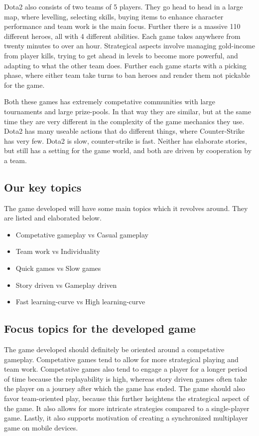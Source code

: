 Dota2 also consists of two teams of 5 players. They go head to head in a large map, where levelling, selecting skills, buying items to enhance character performance and team work is the main focus. Further there is a massive 110 different heroes, all with 4 different abilities. Each game takes anywhere from twenty minutes to over an hour. 
Strategical aspects involve managing gold-income from player kills, trying to get ahead in levels to become more powerful, and adapting to what the other team does. Further each game starts with a picking phase, where either team take turns to ban heroes and render them not pickable for the game.     

Both these games has extremely competative communities with large tournaments and large prize-pools. In that way they are similar, but at the same time they are very different in the complexity of the game mechanics they use. Dota2 has many useable actions that do different things, where Counter-Strike has very few. Dota2 is slow, counter-strike is fast. Neither has elaborate stories, but still has a setting for the game world, and both are driven by cooperation by a team.

\subsection{Our key topics}
The game developed will have some main topics which it revolves around. They are listed and elaborated below.

\begin{itemize}
\item Competative gameplay vs Casual gameplay
\item Team work vs Individuality
\item Quick games vs Slow games
\item Story driven vs Gameplay driven
\item Fast learning-curve vs High learning-curve
\end{itemize}  

\subsection*{Focus topics for the developed game}
The game developed should definitely be oriented around a competative gameplay. Competative games tend to allow for more strategical playing and team work. Competative games also tend to engage a player for a longer period of time because the replayability is high, whereas story driven games often take the player on a journey after which the game has ended. The game should also favor team-oriented play, because this further heightens the strategical aspect of the game.
It also allows for more intricate strategies compared to a single-player game. Lastly, it also supports motivation of creating a synchronized multiplayer game on mobile devices. 

